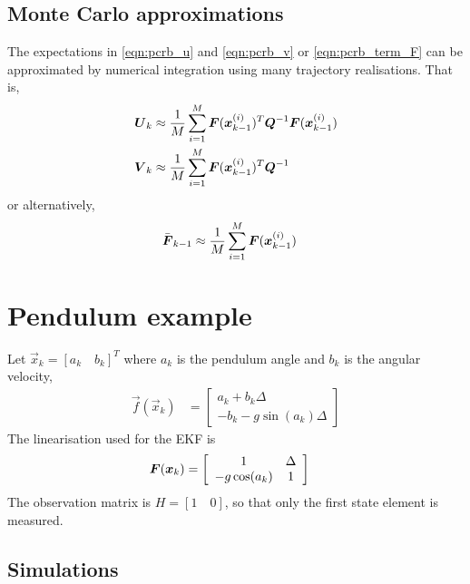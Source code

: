 \documentclass{article}
\begin{document}
\subsection{Monte Carlo approximations}

The expectations in \eqref{eqn:pcrb_u} and \eqref{eqn:pcrb_v} or \eqref{eqn:pcrb_term_F} can be approximated by numerical integration using many trajectory realisations. That is,
\begin{align}
	\boldsymbol{U}_k &\approx \frac{1}{M}\sum_{i=1}^M \boldsymbol{F}({\boldsymbol x}_{k-1}^{(i)})^T\boldsymbol{Q}^{-1} \boldsymbol{F}({\boldsymbol x}_{k-1}^{(i)}) \\
	\boldsymbol{V}_k &\approx \frac{1}{M}\sum_{i=1}^M \boldsymbol{F}({\boldsymbol x}_{k-1}^{(i)})^T\boldsymbol{Q}^{-1}  
\end{align}
or alternatively,
\begin{align}
	\bar{\boldsymbol{F}}_{k-1} &\approx \frac{1}{M}\sum_{i=1}^M \boldsymbol{F}({\boldsymbol x}_{k-1}^{(i)})
\end{align}


\section{Pendulum example}

Let $\vec x_k = [a_k\quad b_k]^T$ where $a_k$ is the pendulum angle and $b_k$ is the angular velocity,
\begin{align}
	\vec f(\vec x_{k}) &= \left[\begin{array}{c}
								a_k + b_k\Delta \\ -b_k - g\sin(a_k)\Delta
								\end{array}\right]
\end{align}
The linearisation used for the EKF is
\begin{align}
	\boldsymbol{F}({\boldsymbol x}_{k}) &= \left[\begin{array}{cc}
					1 & \Delta \\
					-g\cos(a_k) & 1 \\
				\end{array}\right]
\end{align}
The observation matrix is $H=[1\quad 0]$, so that only the first state element is measured.

\subsection{Simulations}
\end{document}
